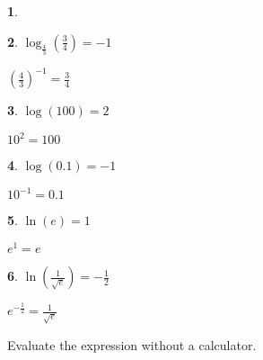 \documentclass{amsbook}
\newtheorem{exc}{}
\newenvironment{ex}{\begin{exc}\normalfont}{\end{exc}}
\numberwithin{section}{chapter}
\numberwithin{equation}{chapter}
\begin{document}
\begin{multicols}{3}
\begin{ex}
\begin{sol}
	\end{sol}
\end{ex}
\begin{ex}
	 $\log_{\frac{4}{3}} \left(\frac{3}{4} \right) = -1$ 
	\begin{sol}
		  $\left(\frac{4}{3} \right)^{-1} = \frac{3}{4}$
	\end{sol}
\end{ex}
\begin{ex}
	$\log(100) = 2$  
	\begin{sol}
	 $10^{2} = 100$	
	\end{sol}
\end{ex}
\begin{ex}
	 $\log (0.1) = -1$ 
	\begin{sol}
		 $10^{-1} = 0.1$
	\end{sol}
\end{ex}
\begin{ex}
	$\ln(e) = 1$ 
	\begin{sol}
		 $e^{1} = e$
	\end{sol}
\end{ex}
\begin{ex}
	$\ln\left(\frac{1}{\sqrt{e}}\right) = -\frac{1}{2}$ 
	\begin{sol}
		 $e^{-\frac{1}{2}} = \frac{1}{\sqrt{e}}$
	\end{sol}
\end{ex}
\end{multicols}

Evaluate the expression without a calculator.
\end{document}
